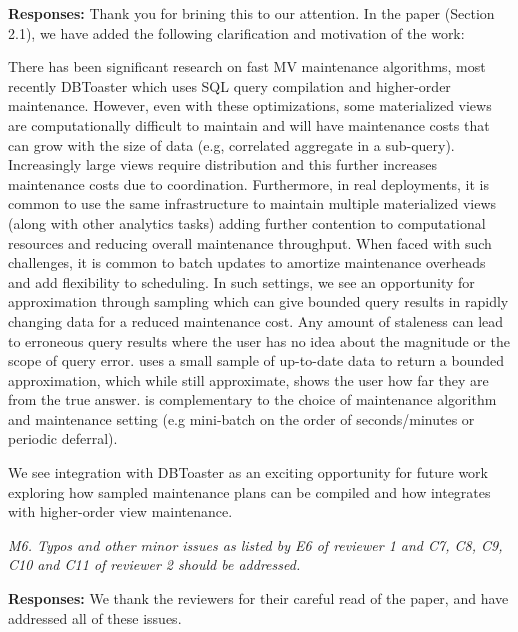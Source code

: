 {\bf Responses:} Thank you for brining this to our attention. In the paper (Section 2.1), we have added the following clarification and motivation of the work:
\begin{displayquote}

There has been significant research on fast MV maintenance algorithms, most recently DBToaster \cite{DBLP:journals/vldb/KochAKNNLS14} which uses SQL query compilation and higher-order maintenance.
However, even with these optimizations, some materialized views are computationally difficult to maintain and will have maintenance costs that can grow with the size of data (e.g, correlated aggregate in a sub-query).
Increasingly large views require distribution and this further increases maintenance costs due to coordination.
Furthermore, in real deployments, it is common to use the same infrastructure to maintain multiple materialized views (along with other analytics tasks) adding further contention to computational resources and reducing overall maintenance throughput. 
When faced with such challenges, it is common to batch updates to amortize maintenance overheads and add flexibility to scheduling.
In such settings, we see an opportunity for approximation through sampling which can give bounded query results in rapidly changing data for a reduced maintenance cost.
Any amount of staleness can lead to erroneous query results where the user has no idea about the magnitude or the scope of query error. 
\svc uses a small sample of up-to-date data to return a bounded approximation, which while still approximate, shows the user how far they are from the true answer.
\svc is complementary to the choice of maintenance algorithm and maintenance setting (e.g mini-batch on the order of seconds/minutes or periodic deferral).
\end{displayquote}

We see integration with DBToaster as an exciting opportunity for future work exploring how sampled maintenance plans can be compiled and how \svc integrates with higher-order view maintenance.

\vspace{1em}
\emph{M6. Typos and other minor issues as listed by E6 of reviewer 1 and C7, C8, C9, C10 and C11 of reviewer 2 should be addressed.}

\vspace{.25em}

{\bf Responses:} We thank the reviewers for their careful read of the paper, and have addressed all of these issues.

